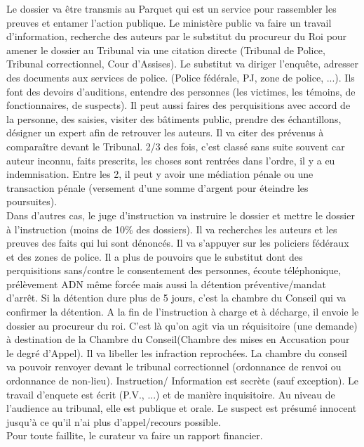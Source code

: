\documentclass{book}
\begin{document}
Le dossier va être transmis au Parquet qui est un service pour rassembler les preuves et entamer l'action publique. Le ministère public va faire un travail d'information, recherche des auteurs par le substitut du procureur du Roi pour amener le dossier au Tribunal via une citation directe (Tribunal de Police, Tribunal correctionnel, Cour d'Assises). Le substitut va diriger l'enquête, adresser des documents aux services de police. (Police fédérale, PJ, zone de police, ...). Ils font des devoirs d'auditions, entendre des personnes (les victimes, les témoins, de fonctionnaires, de suspects). Il peut aussi faires des perquisitions avec accord de la personne, des saisies, visiter des bâtiments public, prendre des échantillons, désigner un expert afin de  retrouver les auteurs. Il va citer des prévenus à comparaître devant le Tribunal. 2/3 des fois, c'est classé sans suite souvent car auteur inconnu, faits prescrits, les choses sont rentrées dans l'ordre, il y a eu indemnisation. Entre les 2, il peut y avoir une médiation pénale ou une transaction pénale (versement d'une somme d'argent pour éteindre les poursuites).\\

Dans d'autres cas, le juge d'instruction va instruire le dossier et mettre le dossier à l'instruction (moins de 10\% des dossiers). Il va recherches les auteurs et les preuves des faits qui lui sont dénoncés. Il va s'appuyer sur les policiers fédéraux et des zones de police. Il a plus de pouvoirs que le substitut dont des perquisitions sans/contre le consentement des personnes, écoute téléphonique, prélèvement ADN même forcée mais aussi la détention préventive/mandat d'arrêt. Si la détention dure plus de 5 jours, c'est la chambre du Conseil qui va confirmer la détention. A la fin de l'instruction à charge et à décharge, il envoie le dossier au procureur du roi. C'est là qu'on agit via un réquisitoire (une demande) à destination de la Chambre du Conseil(Chambre des mises en Accusation pour le degré d'Appel). Il va libeller les infraction reprochées. La chambre du conseil va pouvoir renvoyer devant le tribunal correctionnel  (ordonnance de renvoi ou ordonnance de non-lieu). Instruction/ Information est secrète (sauf exception). Le travail d'enquete est écrit (P.V., ...) et de manière inquisitoire. Au niveau de l'audience au tribunal, elle est publique et orale. Le suspect est présumé innocent jusqu'à ce qu'il n'ai plus d'appel/recours possible.\\

Pour toute faillite, le curateur va faire un rapport financier.\\
\end{document}
